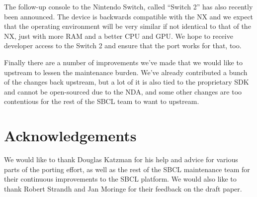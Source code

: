 \documentclass[format=sigconf]{acmart}
\begin{document}
The follow-up console to the Nintendo Switch, called ``Switch 2'' has also recently been announced. The device is backwards compatible with the NX and we expect that the operating environment will be very similar if not identical to that of the NX, just with more RAM and a better CPU and GPU. We hope to receive developer access to the Switch 2 and ensure that the port works for that, too.

Finally there are a number of improvements we've made that we would like to upstream to lessen the maintenance burden. We've already contributed a bunch of the changes back upstream, but a lot of it is also tied to the proprietary SDK and cannot be open-sourced due to the NDA, and some other changes are too contentious for the rest of the SBCL team to want to upstream.

\section{Acknowledgements}\label{acknowledgements}
We would like to thank Douglas Katzman for his help and advice for various parts of the porting effort, as well as the rest of the SBCL maintenance team for their continuous improvements to the SBCL platform. We would also like to thank Robert Strandh and Jan Moringe for their feedback on the draft paper.


\end{document}
